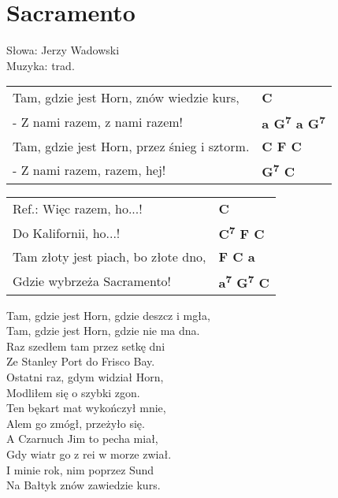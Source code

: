\section{Sacramento}

Słowa: Jerzy Wadowski\\
Muzyka:  trad.

\vspace{2em}
\begin{tabular}{@{}p{7cm}@{}l@{}}
Tam, gdzie jest Horn, znów wiedzie kurs, & \bfseries   C \\
- Z nami razem, z nami razem! & \bfseries   a G\textsuperscript{7} a G\textsuperscript{7} \\
Tam, gdzie jest Horn, przez śnieg i sztorm. & \bfseries   C F C \\
- Z nami razem, razem, hej! & \bfseries   G\textsuperscript{7} C \\
\end{tabular}

\vspace{1em}
\begin{tabular}{@{}p{7cm}@{}l@{}}
Ref.: Więc razem, ho...! & \bfseries   C \\
Do Kalifornii, ho...! & \bfseries   C\textsuperscript{7} F C \\
Tam złoty jest piach, bo złote dno, & \bfseries   F C a \\
Gdzie wybrzeża Sacramento! & \bfseries   a\textsuperscript{7} G\textsuperscript{7} C \\
\end{tabular}

\vspace{1em}
Tam, gdzie jest Horn, gdzie deszcz i mgła, \\
Tam, gdzie jest Horn, gdzie nie ma dna. \\

Raz szedłem tam przez setkę dni \\
Ze Stanley Port do Frisco Bay. \\

Ostatni raz, gdym widział Horn, \\
Modliłem się o szybki zgon. \\

Ten bękart mat wykończył mnie, \\
Alem go zmógł, przeżyło się. \\

A Czarnuch Jim to pecha miał, \\
Gdy wiatr go z rei w morze zwiał. \\

I minie rok, nim poprzez Sund \\
Na Bałtyk znów zawiedzie kurs.
